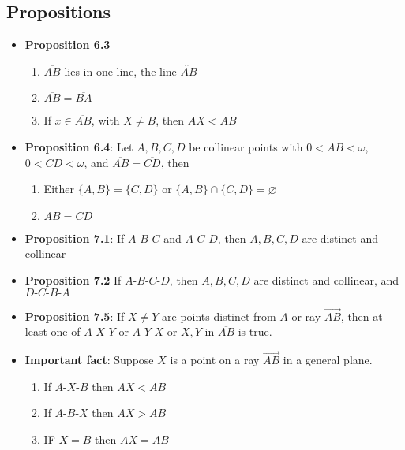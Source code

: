 \documentclass{report}
\begin{document}
    \pagebreak 
    \subsection{Propositions}
    \begin{itemize}
        \item \textbf{Proposition 6.3}
            \begin{enumerate}[label=(\alph*)]
                \item $\overline{AB}$ lies in one line, the line $\overleftrightarrow{AB} $
                \item $\overline{AB} = \overline{BA} $
                \item If $x\in \overline{AB}$, with $X \ne B$, then $AX < AB $
            \end{enumerate}
        \item \textbf{Proposition 6.4}: Let $A,B,C,D$ be collinear points with $0 < AB < \omega$, $0< CD<\omega$, and $\overline{AB} = \overline{CD}$, then
        \begin{enumerate}[label=(\alph*)]
                \item Either $\{A,B\} = \{C,D\}$ or $\{A,B\} \cap \{C,D\} = \varnothing$
                \item $AB = CD$
            \end{enumerate}
        \item \textbf{Proposition 7.1}: If $A\text{-}B\text{-}C$ and $A\text{-}C\text{-}D$, then $A,B,C,D$ are distinct and collinear 
        \item \textbf{Proposition 7.2} If $A\text{-}B\text{-}C\text{-}D$, then $A,B,C,D$ are distinct and collinear, and $D\text{-}C\text{-}B\text{-}A $
        \item \textbf{Proposition 7.5}: If $X \ne Y$ are points distinct from $A$ or ray $\overrightarrow{AB}$, then at least one of $ A\text{-}X\text{-}Y$ or $ A\text{-}Y\text{-}X$ or $X,Y$ in $ \overline{AB}$ is true.
        \item \textbf{Important fact}:  Suppose $X$ is a point on a ray $\overrightarrow{AB}$ in a general plane.
            \begin{enumerate}
                \item If $ A\text{-}X\text{-}B$ then $AX < AB $
                \item If $ A\text{-}B\text{-}X$ then $AX > AB $
                \item IF $X = B$ then $AX = AB$
            \end{enumerate}

\end{itemize}
\end{document}
